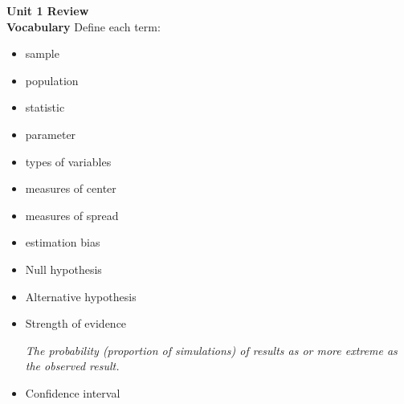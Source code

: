 
\def\theTopic{Unit 1 Review }
\def\dayNum{9}

\begin{center}
{\bf {\large Unit 1 Review }}
 \\
  {\bf Vocabulary} Define each term:
\end{center}
\begin{itemize}
\item sample
\item population
\item statistic
\item parameter
\item types of variables
\item measures of center
\item measures of spread
\item estimation bias
 \item Null hypothesis 
 \item Alternative hypothesis
\item Strength of evidence 
\begin{key}
{\it
    The probability (proportion of simulations) of results as or
    more extreme as the observed result.}
\end{key}
\item Confidence interval
\end{itemize}



